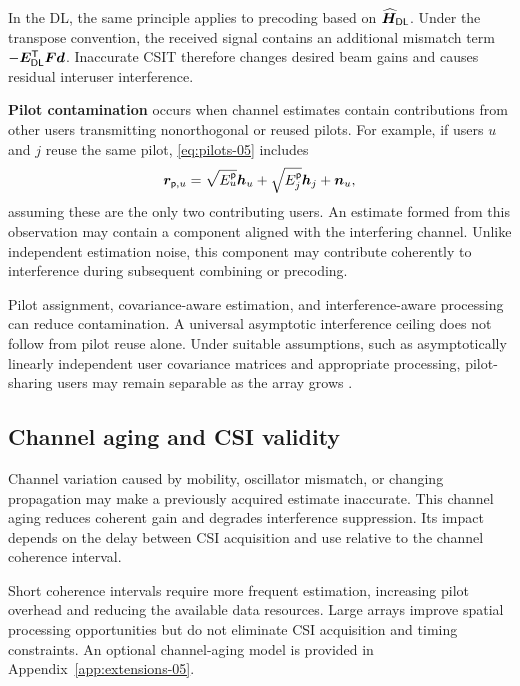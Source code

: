 In the DL, the same principle applies to precoding based on $\widehat{\bm{H}}_{\mathsf{DL}}$. Under the transpose convention, the received signal contains an additional mismatch term $-{\bm{E}}^{\mathsf{T}}_{\mathsf{DL}}\bm{F}\bm{d}$. Inaccurate CSIT therefore changes desired beam gains and causes residual interuser interference.

\textbf{Pilot contamination} occurs when channel estimates contain contributions from other users transmitting nonorthogonal or reused pilots. For example, if users $u$ and $j$ reuse the same pilot, \eqref{eq:pilots-05} includes
\begin{equation*}
	\bm{r}_{\mathsf p,u}
	=\sqrt{E_u^{\mathsf p}}\bm{h}_u
	+\sqrt{E_j^{\mathsf p}}\bm{h}_j+\bm{n}_u,
\end{equation*}
assuming these are the only two contributing users. An estimate formed from this observation may contain a component aligned with the interfering channel. Unlike independent estimation noise, this component may contribute coherently to interference during subsequent combining or precoding.

Pilot assignment, covariance-aware estimation, and interference-aware processing can reduce contamination. A universal asymptotic interference ceiling does not follow from pilot reuse alone. Under suitable assumptions, such as asymptotically linearly independent user covariance matrices and appropriate processing, pilot-sharing users may remain separable as the array grows \cite{unlimited}.

\subsection{Channel aging and CSI validity}
Channel variation caused by mobility, oscillator mismatch, or changing propagation may make a previously acquired estimate inaccurate. This channel aging reduces coherent gain and degrades interference suppression. Its impact depends on the delay between CSI acquisition and use relative to the channel coherence interval.

Short coherence intervals require more frequent estimation, increasing pilot overhead and reducing the available data resources. Large arrays improve spatial processing opportunities but do not eliminate CSI acquisition and timing constraints. An optional channel-aging model is provided in Appendix~\ref{app:extensions-05}.


